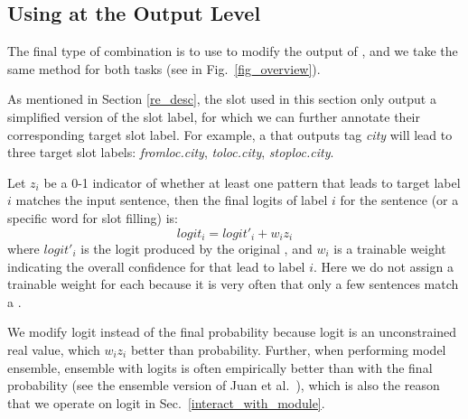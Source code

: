 \subsection{Using \REs at the Output Level}
\label{fusion_with_output}
The final type of combination is to use \RE to modify the output of \NN, and we take the same method for both tasks (see  in Fig.~\ref{fig_overview}).


As mentioned in Section \ref{re_desc},
the slot \REs used in this section only output a simplified version of the slot label, for which we can further
annotate their corresponding target slot label.
For example, a \RE that outputs tag \emph{city} will lead to three target slot labels: \emph{fromloc.city}, \emph{toloc.city}, \emph{stoploc.city}.

Let $z_i$ be a 0-1 indicator of whether at least one \RE pattern that leads to target label $i$ matches the input sentence, then the final logits of label $i$ for the sentence (or a specific word for slot filling) is:
\begin{equation}
logit_i = logit'_i + w_i z_i
\end{equation}
where $logit'_i$ is the logit produced by the original \NN, and $w_i$ is a trainable weight indicating the overall confidence for \REs that lead to label $i$.
Here we do not assign a trainable weight for each \RE because it is very often that only a few sentences match a \RE.

We modify logit instead of the final probability because logit is an unconstrained real value, which  $w_i z_i$ better than probability.
Further, when performing model ensemble,
ensemble with logits is often empirically better than with the final probability (see the ensemble version of Juan et al.~), which is also the reason that we operate on logit %
in Sec.~\ref{interact_with_module}.
